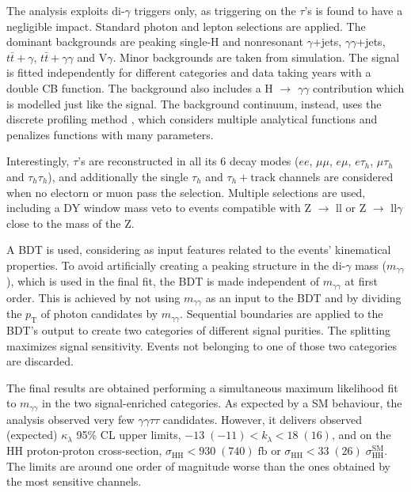 \documentclass[11pt]{article}
\newcommand{\kl}{\kappa_{\lambda}}
\newcommand{\mgg}{m_{\gamma\gamma}}
\newcommand{\pt}{p_{\text{T}}}
\newcommand{\hgg}{H $\rightarrow$ $\gamma\gamma$}
\newcommand{\ttbar}{t\bar{t}}
\newcommand{\zllg}{Z $\rightarrow$ ll$\gamma$}
\newcommand{\zll}{Z $\rightarrow$ ll}
\begin{document}
The analysis exploits di-\(\gamma\) triggers only, as triggering on the \(\tau\)'s is found to have a negligible impact.
Standard photon and lepton selections are applied.
The dominant backgrounds are peaking single-H and nonresonant \(\gamma\)+jets, \(\gamma \gamma\)+jets, \(\ttbar+\gamma\), \(\ttbar+\gamma\gamma\) and V\(\gamma\).
Minor backgrounds are taken from simulation.
The signal is fitted independently for different categories and data taking years with a double \ac{CB} function.
The background also includes a \hgg{} contribution which is modelled just like the signal.
The background continuum, instead, uses the discrete profiling method \cite{discrete_profiling}, which considers multiple analytical functions and penalizes functions with many parameters.

Interestingly, \(\tau\)’s are reconstructed in all its 6 decay modes (\(ee\), \(\mu\mu\), \(e\mu\), \(e\tau_{h}\), \(\mu\tau_{h}\) and \(\tau_{h}\tau_{h}\)), and additionally the single \(\tau_{h}\) and \(\tau_{h}+\text{track}\) channels are considered when no electorn or muon pass the selection.
Multiple selections are used, including a DY window mass veto to events compatible with \zll{} or \zllg{} close to the mass of the Z.

A \ac{BDT} is used, considering as input features related to the events' kinematical properties.
To avoid artificially creating a peaking structure in the di-\(\gamma\) mass (\(\mgg\)), which is used in the final fit, the \ac{BDT} is made independent of \(\mgg\) at first order.
This is achieved by not using \(\mgg\) as an input to the \ac{BDT} and by dividing the \(\pt\) of photon candidates by \(\mgg\).
Sequential boundaries are applied to the \ac{BDT}'s output to create two categories of different signal purities.
The splitting maximizes signal sensitivity.
Events not belonging to one of those two categories are discarded.

The final results are obtained performing a simultaneous maximum likelihood fit to \(\mgg\) in the two signal-enriched categories.
As expected by a SM behaviour, the analysis observed very few \(\gamma \gamma \tau \tau\) candidates.
However, it delivers observed (expected) \(\kl\) 95\% \ac{CL} upper limits, \(-13\;(-11) < k_{\lambda} < 18\;(16)\), and on the HH proton-proton cross-section, \(\sigma_{\text{HH}} < 930\;(740)\;\si{\femto\barn}\) or \(\sigma_{\text{HH}} < 33\;(26)\;\sigma_{\text{HH}}^{\text{SM}}\).
The limits are around one order of magnitude worse than the ones obtained by the most sensitive channels.
\end{document}
